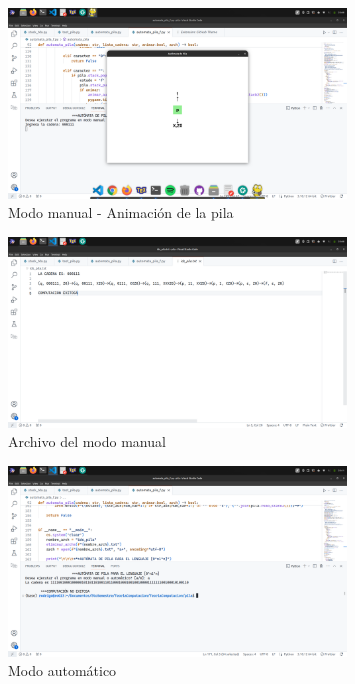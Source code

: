\documentclass[11pt]{article} %
\begin{document}
	\newpage
	
	
	\begin{figure}[h]
		\centering
		\includegraphics[width=0.8\textwidth]{manual2}
		\caption{Modo manual - Animación de la pila}
	\end{figure}
	
	\begin{figure}[h]
		\centering
		\includegraphics[width=0.8\textwidth]{arch1}
		\caption{Archivo del modo manual}
	\end{figure}
	
	\newpage
	
	\begin{figure}[h]
		\centering
		\includegraphics[width=0.8\textwidth]{auto}
		\caption{Modo automático}
	\end{figure}
	
\end{document}
